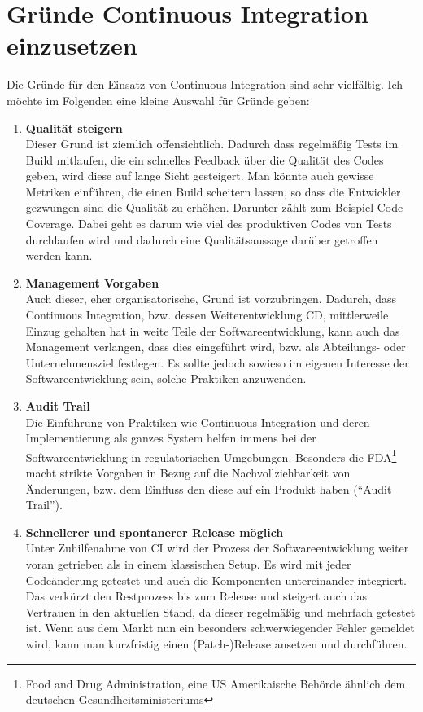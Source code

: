 \section{Gründe Continuous Integration einzusetzen}\label{sec:Gründe Continuous Integration einzusetzen}
Die Gründe für den Einsatz von Continuous Integration sind sehr vielfältig. Ich möchte im Folgenden eine kleine Auswahl für Gründe geben:
\begin{enumerate}
	\item \textbf{Qualität steigern}\\
	Dieser Grund ist ziemlich offensichtlich. Dadurch dass regelmäßig Tests im Build mitlaufen, die ein schnelles Feedback über die Qualität des Codes geben, wird diese auf lange Sicht gesteigert. Man könnte auch gewisse Metriken einführen, die einen Build scheitern lassen, so dass die Entwickler gezwungen sind die Qualität zu erhöhen. Darunter zählt zum Beispiel Code Coverage. Dabei geht es darum wie viel des produktiven Codes von Tests durchlaufen wird und dadurch eine Qualitätsaussage darüber getroffen werden kann.
	\item \textbf{Management Vorgaben}\\
	Auch dieser, eher organisatorische, Grund ist vorzubringen. Dadurch, dass Continuous Integration, bzw. dessen Weiterentwicklung CD, mittlerweile Einzug gehalten hat in weite Teile der Softwareentwicklung, kann auch das Management verlangen, dass dies eingeführt wird, bzw. als Abteilungs- oder Unternehmensziel festlegen. Es sollte jedoch sowieso im eigenen Interesse der Softwareentwicklung sein, solche Praktiken anzuwenden.
	\item \textbf{Audit Trail}\\
	Die Einführung von Praktiken wie Continuous Integration und deren Implementierung als ganzes System helfen immens bei der Softwareentwicklung in regulatorischen Umgebungen. Besonders die FDA\footnote{Food and Drug Administration, eine US Amerikaische Behörde ähnlich dem deutschen Gesundheitsministeriums} macht strikte Vorgaben in Bezug auf die Nachvollziehbarkeit von Änderungen, bzw. dem Einfluss den diese auf ein Produkt haben ("`Audit Trail"').
	\item \textbf{Schnellerer und spontanerer Release möglich}\\
	Unter Zuhilfenahme von CI wird der Prozess der Softwareentwicklung weiter voran getrieben als in einem klassischen Setup. Es wird mit jeder Codeänderung getestet und auch die Komponenten untereinander integriert. Das verkürzt den Restprozess bis zum Release und steigert auch das Vertrauen in den aktuellen Stand, da dieser regelmäßig und mehrfach getestet ist. Wenn aus dem Markt nun ein besonders schwerwiegender Fehler gemeldet wird, kann man kurzfristig einen (Patch-)Release ansetzen und durchführen.

\end{enumerate}
